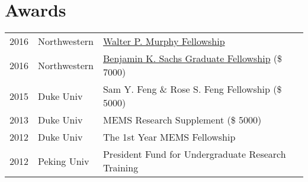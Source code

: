 \documentclass[]{Current-DS}
\begin{document}
\begin{minipage}[t]{0.66\textwidth}


\section{Awards} 
\begin{tabular}{rll}
2016  &Northwestern  & \href{https://www.mccormick.northwestern.edu/alumni/murphy-society-awards/}{Walter P. Murphy Fellowship}\\
2016  &Northwestern   & \href{http://www.mccormick.northwestern.edu/industrial/phd-program/phd-admissions/funding-information.html}{Benjamin K. Sachs Graduate Fellowship} (\$ 7000)\\
2015  &Duke Univ & Sam Y. Feng \& Rose S. Feng Fellowship (\$ 5000)\\
2013  &Duke Univ & MEMS Research Supplement (\$ 5000)\\
2012  &Duke Univ & The 1st Year MEMS Fellowship  \\
2012  &Peking Univ & President Fund for Undergraduate Research Training \\
\end{tabular}
\sectionsep



\sectionsep

\end{minipage} 
\end{document}

